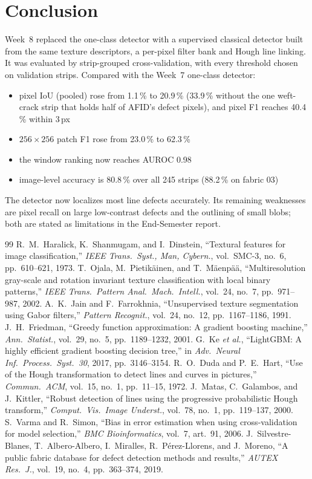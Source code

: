 \documentclass[11pt,a4paper]{article}
\begin{document}
\section*{Conclusion}
Week~8 replaced the one-class detector with a supervised classical detector built from the same texture descriptors, a per-pixel filter bank and Hough line linking. It was evaluated by strip-grouped cross-validation, with every threshold chosen on validation strips. Compared with the Week~7 one-class detector:
\begin{itemize}
  \item pixel IoU (pooled) rose from 1.1\,\% to 20.9\,\% (33.9\,\% without the one weft-crack strip that holds half of AFID's defect pixels), and pixel F1 reaches 40.4\,\% within 3\,px
  \item $256\times256$ patch F1 rose from 23.0\,\% to 62.3\,\%
  \item the window ranking now reaches AUROC 0.98
  \item image-level accuracy is 80.8\,\% over all 245 strips (88.2\,\% on fabric 03)
\end{itemize}
The detector now localizes most line defects accurately. Its remaining weaknesses are pixel recall on large low-contrast defects and the outlining of small blobs; both are stated as limitations in the End-Semester report.

\begin{thebibliography}{99}
\small
{} R.~M.~Haralick, K.~Shanmugam, and I.~Dinstein, ``Textural features for image classification,'' \emph{IEEE Trans.\ Syst., Man, Cybern.}, vol.~SMC-3, no.~6, pp.~610--621, 1973.
 T.~Ojala, M.~Pietik\"ainen, and T.~M\"aenp\"a\"a, ``Multiresolution gray-scale and rotation invariant texture classification with local binary patterns,'' \emph{IEEE Trans.\ Pattern Anal.\ Mach.\ Intell.}, vol.~24, no.~7, pp.~971--987, 2002.
 A.~K.~Jain and F.~Farrokhnia, ``Unsupervised texture segmentation using Gabor filters,'' \emph{Pattern Recognit.}, vol.~24, no.~12, pp.~1167--1186, 1991.
 J.~H.~Friedman, ``Greedy function approximation: A gradient boosting machine,'' \emph{Ann.\ Statist.}, vol.~29, no.~5, pp.~1189--1232, 2001.
 G.~Ke \emph{et al.}, ``LightGBM: A highly efficient gradient boosting decision tree,'' in \emph{Adv.\ Neural Inf.\ Process.\ Syst.~30}, 2017, pp.~3146--3154.
 R.~O.~Duda and P.~E.~Hart, ``Use of the Hough transformation to detect lines and curves in pictures,'' \emph{Commun.\ ACM}, vol.~15, no.~1, pp.~11--15, 1972.
 J.~Matas, C.~Galambos, and J.~Kittler, ``Robust detection of lines using the progressive probabilistic Hough transform,'' \emph{Comput.\ Vis.\ Image Underst.}, vol.~78, no.~1, pp.~119--137, 2000.
 S.~Varma and R.~Simon, ``Bias in error estimation when using cross-validation for model selection,'' \emph{BMC Bioinformatics}, vol.~7, art.~91, 2006.
 J.~Silvestre-Blanes, T.~Albero-Albero, I.~Miralles, R.~P\'erez-Llorens, and J.~Moreno, ``A public fabric database for defect detection methods and results,'' \emph{AUTEX Res.\ J.}, vol.~19, no.~4, pp.~363--374, 2019.
\end{thebibliography}
\end{document}
